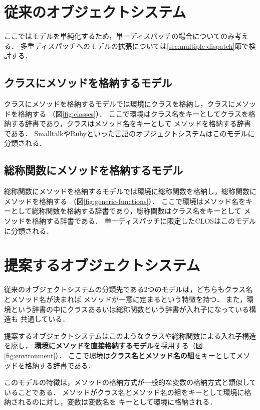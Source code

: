 \documentclass{ipsjprosym}
\begin{document}
\section{従来のオブジェクトシステム}

ここではモデルを単純化するため，単一ディスパッチの場合についてのみ考える．
多重ディスパッチへのモデルの拡張については\ref{sec:multiple-dispatch}節で検討する．

\subsection{クラスにメソッドを格納するモデル}
\label{sec:classes}

クラスにメソッドを格納するモデルでは環境にクラスを格納し，クラスにメソッドを格納する
（図\ref{fig:classes}）．
ここで環境はクラス名をキーとしてクラスを格納する辞書であり，クラスはメソッド名をキーとして
メソッドを格納する辞書である．
SmalltalkやRubyといった言語のオブジェクトシステムはこのモデルに分類される．

\subsection{総称関数にメソッドを格納するモデル}
\label{sec:generic-finctions}

総称関数にメソッドを格納するモデルでは環境に総称関数を格納し，総称関数にメソッドを格納する
（図\ref{fig:generic-functions}）．
ここで環境はメソッド名をキーとして総称関数を格納する辞書であり，総称関数はクラス名をキーとして
メソッドを格納する辞書である．
単一ディスパッチに限定したCLOSはこのモデルに分類される．

\section{提案するオブジェクトシステム}
\label{sec:proposal}

従来のオブジェクトシステムの分類先である2つのモデルは，どちらもクラス名とメソッド名が決まれば
メソッドが一意に定まるという特徴を持つ．
また，環境という辞書の中にクラスあるいは総称関数という辞書が入れ子になっている構造も
共通している．

提案するオブジェクトシステムはこのようなクラスや総称関数による入れ子構造を廃し，
\textbf{環境にメソッドを直接格納するモデル}を採用する（図\ref{fig:environment}）．
ここで環境は\textbf{クラス名とメソッド名の組}をキーとしてメソッドを格納する辞書である．

このモデルの特徴は，メソッドの格納方式が一般的な変数の格納方式と類似していることである．
メソッドがクラス名とメソッド名の組をキーとして環境に格納されるのに対し，変数は変数名を
キーとして環境に格納される．
\end{document}
